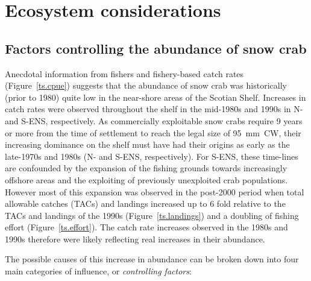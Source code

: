 \documentclass[11pt]{article}
\begin{document}
\section{Ecosystem considerations}

\subsection{Factors controlling the abundance of snow crab}

Anecdotal information from fishers and fishery-based catch rates (Figure~\ref{ts.cpue}) suggests that the abundance of snow crab was historically (prior to 1980) quite low in the near-shore areas of the Scotian Shelf. Increases in catch rates were observed throughout the shelf in the mid-1980s and 1990s in N- and S-ENS, respectively. As commercially exploitable snow crabs require 9 years or more from the time of settlement to reach the legal size of 95~mm~CW, their increasing dominance on the shelf must have had their origins as early as the late-1970s and 1980s (N- and S-ENS, respectively). For S-ENS, these time-lines are confounded by the expansion of the fishing grounds towards increasingly offshore areas and the exploiting of previously unexploited crab populations. However most of this expansion was observed in the post-2000 period when total allowable catches (TACs) and landings increased up to 6 fold relative to the TACs and landings of the 1990s (Figure~\ref{ts.landings}) and a doubling of fishing effort (Figure~\ref{ts.effort}). The catch rate increases observed in the 1980s and 1990s therefore were likely reflecting real increases in their abundance.

The possible causes of this increase in abundance can be broken down into four main categories of influence, or \emph{controlling factors}:
\end{document}
